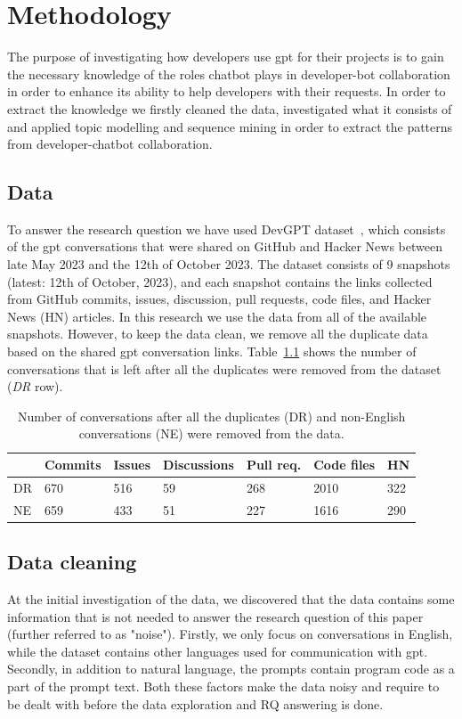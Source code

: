 \chapter{Methodology} \label{methodology}
The purpose of investigating how developers use \gls{gpt} for their projects is to gain the necessary knowledge of the roles chatbot plays in developer-bot collaboration in order to enhance its ability to help developers with their requests. In order to extract the knowledge we firstly cleaned the data, investigated what it consists of and applied topic modelling and sequence mining in order to extract the patterns from developer-chatbot collaboration. 

\section{Data} 
To answer the research question we have used DevGPT dataset~\cite{devgpt}, which consists of the \gls{gpt} conversations that were shared on GitHub and Hacker News between late May 2023 and the 12th of October 2023. The dataset consists of 9 snapshots (latest: 12th of October, 2023), and each snapshot contains the links collected from GitHub commits, issues, discussion, pull requests, code files, and Hacker News (HN) articles. In this research we use the data from all of the available snapshots. However, to keep the data clean, we remove all the duplicate data based on the shared \gls{gpt} conversation links. Table~\ref{table:data_stat} shows the number of conversations that is left after all the duplicates were removed from the dataset (\textit{DR} row).

\begin{table}[h]
    \centering
    \begin{tabular}{|l|l|l|l|l|l|l|}
         \hline
        & Commits & Issues & Discussions & Pull req. & Code files  & HN  \\
         \hline
        DR & 670 & 516 & 59 & 268 & 2010 & 322\\
         \hline
        NE & 659 & 433 & 51 & 227 & 1616 & 290\\
        \hline
    \end{tabular}
    \caption{Number of conversations after all the duplicates (DR) and non-English conversations (NE) were removed from the data.}
    \label{table:data_stat}
\end{table}

\section{Data cleaning}
At the initial investigation of the data, we discovered that the data contains some information that is not needed to answer the research question of this paper (further referred to as "noise"). Firstly, we only focus on conversations in English, while the dataset contains other languages used for communication with \gls{gpt}. Secondly, in addition to natural language, the prompts  contain program code as a part of the prompt text. Both these factors make the data noisy and require to be dealt with before the data exploration and RQ answering is done. 

